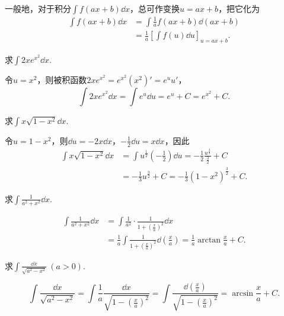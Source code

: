 一般地，对于积分\(\int f(ax+b) \dd{x}\)，总可作变换\(u=ax+b\)，把它化为\begin{align*}
\int f(ax+b) \dd{x}
&= \int \frac{1}{a} f(ax+b) \dd(ax+b) \\
&= \frac{1}{a} \left[ \int f(u) \dd{u} \right]_{u=ax+b}.
\end{align*}

\begin{example}
求\(\int 2x e^{x^2} \dd{x}\).
\begin{solution}
令\(u=x^2\)，则被积函数\(2x e^{x^2} = e^{x^2} (x^2)' = e^u u'\)，\[
\int 2x e^{x^2} \dd{x}
= \int e^u \dd{u}
= e^u + C
= e^{x^2} + C.
\]
\end{solution}
\end{example}

\begin{example}
求\(\int x \sqrt{1-x^2} \dd{x}\).
\begin{solution}
令\(u=1-x^2\)，则\(\dd{u} = -2x\dd{x}\)，\(-\frac{1}{2}\dd{u} = x\dd{x}\)，因此\begin{align*}
\int x \sqrt{1-x^2} \dd{x}
&= \int u^{\frac{1}{2}} \left(-\frac{1}{2}\right) \dd{u}
= -\frac{1}{2} \frac{u^{\frac{3}{2}}}{\frac{3}{2}} + C \\
&= -\frac{1}{3} u^{\frac{3}{2}} + C
= -\frac{1}{3} (1-x^2)^{\frac{3}{2}} + C.
\end{align*}
\end{solution}
\end{example}

\begin{example}
求\(\int \frac{1}{a^2+x^2} \dd{x}\).
\begin{solution}
\begin{align*}
\int \frac{1}{a^2+x^2} \dd{x}
&= \int \frac{1}{a^2} \cdot \frac{1}{1+\left(\frac{x}{a}\right)^2} \dd{x} \\
&= \frac{1}{a} \int \frac{1}{1+\left(\frac{x}{a}\right)^2} \dd(\frac{x}{a})
= \frac{1}{a} \arctan\frac{x}{a} + C.
\end{align*}
\end{solution}
\end{example}

\begin{example}
求\(\int \frac{\dd{x}}{\sqrt{a^2-x^2}}\ (a>0)\).
\begin{solution}
\[
\int \frac{\dd{x}}{\sqrt{a^2-x^2}}
= \int \frac{1}{a} \frac{\dd{x}}{\sqrt{1-\left(\frac{x}{a}\right)^2}}
= \int \frac{\dd(\frac{x}{a})}{\sqrt{1-\left(\frac{x}{a}\right)^2}}
= \arcsin\frac{x}{a} + C.
\]
\end{solution}
\end{example}

